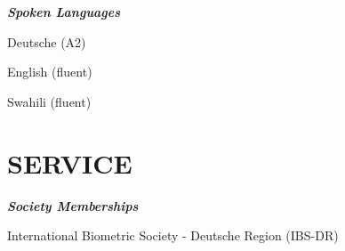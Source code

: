 \documentclass[13pt,]{article}
\providecommand{\tightlist}{%
  \setlength{\itemsep}{0pt}\setlength{\parskip}{0pt}}
\renewenvironment{itemize}{
  \begin{list}{}{
    \setlength{\leftmargin}{1.5em}
  }
}{
  \end{list}
}
\begin{document}
\emph{\textbf{Spoken Languages}}

\begin{itemize}
\tightlist
\item
  Deutsche (A2)
\item
  English (fluent)
\item
  Swahili (fluent)
\end{itemize}

\hypertarget{service}{%
\section{\texorpdfstring{\textbf{SERVICE}}{SERVICE}}\label{service}}

\emph{\textbf{Society Memberships}}

\begin{itemize}
\tightlist
\item
  International Biometric Society - Deutsche Region (IBS-DR)
\end{itemize}
\end{document}
